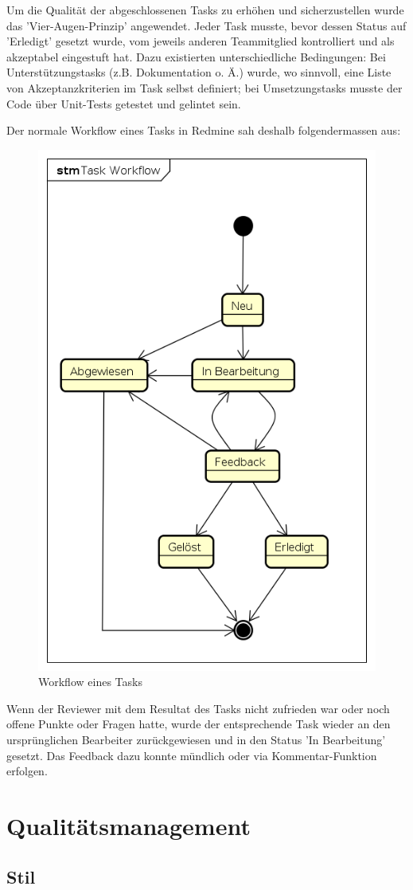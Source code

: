 Um die Qualität der abgeschlossenen Tasks zu erhöhen und sicherzustellen wurde das 'Vier-Augen-Prinzip' angewendet. Jeder Task musste, bevor dessen Status auf 'Erledigt' gesetzt wurde, vom jeweils anderen Teammitglied kontrolliert und als akzeptabel eingestuft hat. Dazu existierten unterschiedliche Bedingungen: Bei Unterstützungstasks (z.B. Dokumentation o. Ä.) wurde, wo sinnvoll, eine Liste von Akzeptanzkriterien im Task selbst definiert; bei Umsetzungstasks musste der Code über Unit-Tests getestet und gelintet sein.


Der normale Workflow eines Tasks in Redmine sah deshalb folgendermassen aus:

\begin{figure}[H]
	\centering
	\includegraphics[width=0.5\linewidth]{fig/task_workflow}
	\caption{Workflow eines Tasks}
	\label{fig:pm:workflow}
\end{figure}

Wenn der Reviewer mit dem Resultat des Tasks nicht zufrieden war oder noch offene Punkte oder Fragen hatte, wurde der entsprechende Task wieder an den ursprünglichen Bearbeiter zurückgewiesen und in den Status 'In Bearbeitung' gesetzt. Das Feedback dazu konnte mündlich oder via Kommentar-Funktion erfolgen.

\section{Qualitätsmanagement}

\subsection*{Stil}

